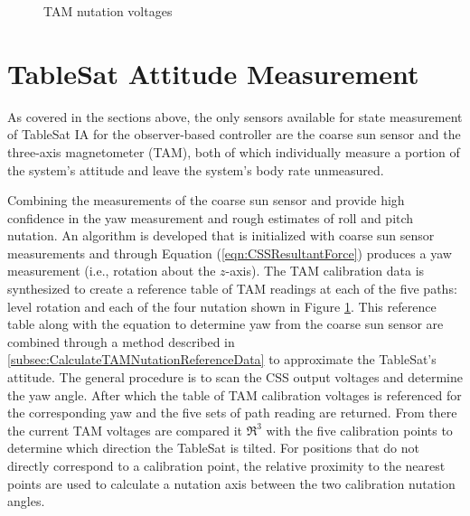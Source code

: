 \begin{figure}[H]
  \centerline{}
  \caption{TAM nutation voltages}
  \label{fig:TAMNutationVoltages}
\end{figure}

\section{TableSat Attitude Measurement}
\label{subsec:StateMeasurement}

As covered in the sections above, the only sensors available for state measurement of TableSat IA for the observer-based controller are the coarse sun sensor and the three-axis magnetometer (TAM), both of which individually measure a portion of the system's attitude and leave the system's body rate unmeasured.

Combining the measurements of the coarse sun sensor and provide high confidence in the yaw measurement and rough estimates of roll and pitch nutation.  An algorithm is developed that is initialized with coarse sun sensor measurements and through Equation (\ref{eqn:CSSResultantForce}) produces a yaw measurement (i.e., rotation about the $z$-axis).  The TAM calibration data is synthesized to create a reference table of TAM readings at each of the five paths: level rotation and each of the four nutation shown in Figure \ref{fig:TAMNutationVoltages}.  This reference table along with the equation to determine yaw from the coarse sun sensor are combined through a method described in \ref{subsec:CalculateTAMNutationReferenceData} to approximate the TableSat's attitude.  The general procedure is to scan the CSS output voltages and determine the yaw angle.  After which the table of TAM calibration voltages is referenced for the corresponding yaw and the five sets of path reading are returned.  From there the current TAM voltages are compared it $\Re^3$ with the five calibration points to determine which direction the TableSat is tilted.  For positions that do not directly correspond to a calibration point, the relative proximity to the nearest points are used to calculate a nutation axis between the two calibration nutation angles.
